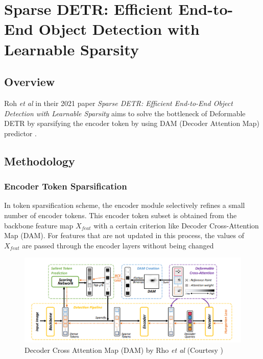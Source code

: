 \section{Sparse DETR: Efficient End-to-End Object Detection with Learnable Sparsity}

\label{appendix:sparse-detr-paper}

\subsection{Overview}

\par Roh \textit{et al} in their 2021 paper \textit{Sparse DETR: Efficient End-to-End Object Detection with Learnable Sparsity} aims to solve the bottleneck of Deformable DETR by sparsifying the encoder token by using DAM (Decoder Attention Map) predictor \cite{roh2021sparse}.

\subsection{Methodology}
\subsubsection{Encoder Token Sparsification} 
\par In token sparsification scheme, the encoder module selectively refines a small number of encoder tokens. This encoder token subset is obtained from the backbone feature map $X_{feat}$ with a certain criterion like Decoder Cross-Attention Map (DAM). For features that are not updated in this process, the values of $X_{feat}$ are passed through the encoder layers without being changed

\begin{figure}[h]
	\centering
	\includegraphics[width=\linewidth]{assets/img/sparse-detr-dam.png}
	\caption{ Decoder Cross Attention Map (DAM) by Rho
		\textit{et al} (Courtesy \cite{roh2021sparse})}
\end{figure}

